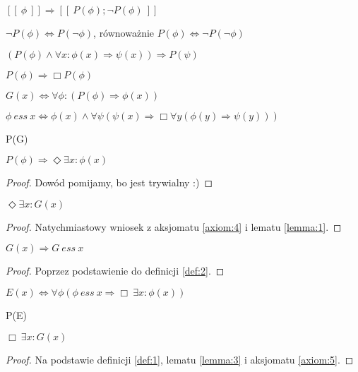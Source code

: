 \begin{assumption} \label{ass:1}
    $ [\![ \ \phi \ ]\!] \Longrightarrow [\![ \ P(\phi); \neg P(\phi) \ ]\!]$
\end{assumption}
\begin{axiom}[Dualność] \label{axiom:1}
    $\neg P(\phi) \Leftrightarrow P(\neg \phi)$, równoważnie $P(\phi) \Leftrightarrow \neg P(\neg \phi)$
\end{axiom}
\begin{axiom}[Całkowitość] \label{axiom:2}
    $ \left( P(\phi) \wedge \forall x: \phi(x) \Rightarrow \psi(x) \right) \Rightarrow P(\psi) $
\end{axiom}
\begin{axiom}[Absolutność] \label{axiom:3}
    $ P(\phi) \Rightarrow \Box P(\phi) $
\end{axiom}
\begin{definition} \label{def:1}
    $ G(x) \Leftrightarrow \forall \phi: \left( P(\phi) \Rightarrow \phi(x) \right) $
\end{definition}
\begin{definition} \label{def:2}
    $ \phi \ ess \ x \Leftrightarrow \phi(x) \wedge \forall \psi \left( \psi(x) \Rightarrow \Box \forall y \left( \phi(y) \Rightarrow \psi(y) \right) \right)  $
\end{definition}
\begin{axiom} \label{axiom:4}
    P(G)
\end{axiom}
\begin{lemma} \label{lemma:1}
    $ P(\phi) \Rightarrow \Diamond \exists x : \phi(x) $
\end{lemma}
\begin{proof}
    Dowód pomijamy, bo jest trywialny :)
\end{proof}
\begin{lemma} \label{lemma:2}
    $ \Diamond \exists x : G(x) $
\end{lemma}
\begin{proof}
    Natychmiastowy wniosek z aksjomatu \ref{axiom:4} i lematu \ref{lemma:1}.
\end{proof}
\begin{lemma} \label{lemma:3}
    $ G(x) \Rightarrow G \ ess \ x $
\end{lemma}
\begin{proof}
    Poprzez podstawienie do definicji \ref{def:2}.
\end{proof}
\begin{definition} \label{def:3}
    $ E(x) \Leftrightarrow \forall \phi \left( \phi \ ess \ x \Rightarrow \Box\ \exists x: \phi(x) \right) $
\end{definition}
\begin{axiom} \label{axiom:5}
    P(E)
\end{axiom}
\begin{theorem}
    $ \Box\ \exists x : G(x) $
\end{theorem}
\begin{proof}
    Na podstawie definicji \ref{def:1}, lematu \ref{lemma:3} i aksjomatu \ref{axiom:5}.
\end{proof}
